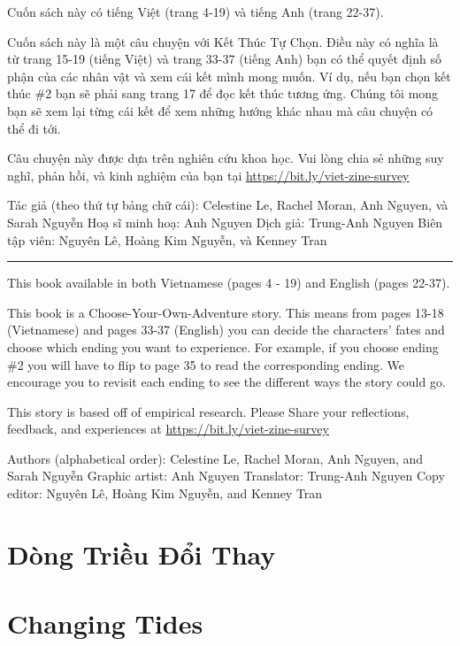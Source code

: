 \documentclass[
]{book}
\begin{document}
Cuốn sách này có tiếng Việt (trang 4-19) và tiếng Anh (trang 22-37).

Cuốn sách này là một câu chuyện với Kết Thúc Tự Chọn. Điều này có nghĩa là từ trang 15-19 (tiếng Việt) và trang 33-37 (tiếng Anh) bạn có thể quyết định số phận của các nhân vật và xem cái kết mình mong muốn. Ví dụ, nếu bạn chọn kết thúc \#2 bạn sẽ phải sang trang 17 để đọc kết thúc tương ứng. Chúng tôi mong bạn sẽ xem lại từng cái kết để xem những hướng khác nhau mà câu chuyện có thể đi tới.

Câu chuyện này được dựa trên nghiên cứu khoa học. Vui lòng chia sẻ những suy nghĩ, phản hồi, và kinh nghiệm của bạn tại \url{https://bit.ly/viet-zine-survey}

Tác giả (theo thứ tự bảng chữ cái): Celestine Le, Rachel Moran, Anh Nguyen, và Sarah Nguyễn
Hoạ sĩ minh hoạ: Anh Nguyen
Dịch giả: Trung-Anh Nguyen
Biên tập viên: Nguyên Lê, Hoàng Kim Nguyễn, và Kenney Tran

\begin{center}\rule{0.5\linewidth}{0.5pt}\end{center}

This book available in both Vietnamese (pages 4 - 19) and English (pages 22-37).

This book is a Choose-Your-Own-Adventure story. This means from pages 13-18 (Vietnamese) and pages 33-37 (English) you can decide the characters' fates and choose which ending you want to experience. For example, if you choose ending \#2 you will have to flip to page 35 to read the corresponding ending. We encourage you to revisit each ending to see the different ways the story could go.

This story is based off of empirical research. Please Share your reflections, feedback, and experiences at \url{https://bit.ly/viet-zine-survey}

Authors (alphabetical order): Celestine Le, Rachel Moran, Anh Nguyen, and Sarah Nguyễn
Graphic artist: Anh Nguyen
Translator: Trung-Anh Nguyen
Copy editor: Nguyên Lê, Hoàng Kim Nguyễn, and Kenney Tran

\hypertarget{duxf2ng-triux1ec1u-ux111ux1ed5i-thay}{%
\chapter{Dòng Triều Đổi Thay}\label{duxf2ng-triux1ec1u-ux111ux1ed5i-thay}}

\hypertarget{changing-tides}{%
\chapter{Changing Tides}\label{changing-tides}}
\end{document}
